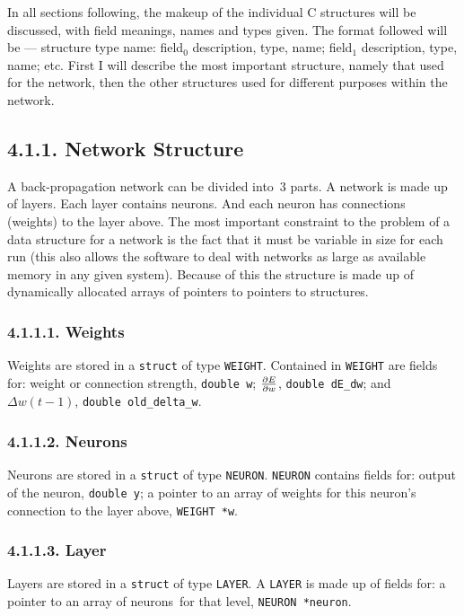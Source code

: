 \documentclass[12pt]{report}
\begin{document}
In all sections following, the makeup of the individual C structures
will be discussed, with field meanings, names and types given.
The format followed will be --- structure type name: field$_0$
description, type, name; field$_1$ description, type, name; etc.
First I will describe the most important structure, namely that used
for the network, then the other structures used for different
purposes within the network.

\subsection{4.1.1. Network Structure}

A back-propagation network can be divided into~$3$ parts.
A network is made up of layers.
Each layer contains neurons.
And each neuron has connections (weights) to the layer above.
The most important constraint to the problem of a data structure for
a network is the fact that it must be variable in size for each run
(this also allows the software to deal with networks as large as
available memory in any given system).
Because of this the structure is made up of dynamically allocated
arrays of pointers to pointers to structures.

\subsubsection{4.1.1.1. Weights}

Weights are stored in a \texttt{struct} of type \texttt{WEIGHT}.
Contained in \texttt{WEIGHT} are fields for: weight or connection
strength, \texttt{double w}; $\partial E \over \partial w$, \texttt{double
dE\_dw}; and $\Delta w(t-1)$, \texttt{double old\_delta\_w}.

\subsubsection{4.1.1.2. Neurons}

Neurons are stored in a \texttt{struct} of type \texttt{NEURON}.
\texttt{NEURON} contains fields for: output of the neuron, \texttt{double
y}; a pointer to an array of weights for this neuron's connection 
to the layer above, \texttt{WEIGHT *w}.

\subsubsection{4.1.1.3. Layer}

Layers are stored in a \texttt{struct} of type \texttt{LAYER}.
A \texttt{LAYER} is made up of fields for: a pointer to an array of neurons\
for that level, \texttt{NEURON *neuron}.
\end{document}
